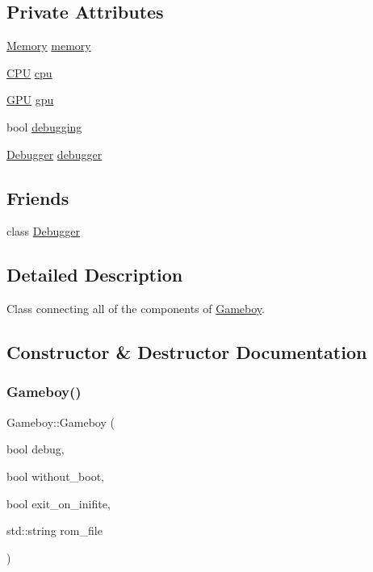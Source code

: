 \subsection*{Private Attributes}
\begin{DoxyCompactItemize}
\item 
\mbox{\hyperlink{classMemory}{Memory}} \mbox{\hyperlink{classGameboy_adf627b4691eb953f162584daf2b539a9}{memory}}
\item 
\mbox{\hyperlink{classCPU}{C\+PU}} \mbox{\hyperlink{classGameboy_a8efc19636204afd797a1fc3493bd2bce}{cpu}}
\item 
\mbox{\hyperlink{classGPU}{G\+PU}} \mbox{\hyperlink{classGameboy_ab5374ee382793a6e7f4fe26e55c9ff94}{gpu}}
\item 
bool \mbox{\hyperlink{classGameboy_a3806b14c93f07ab3aa7c8bce7f47ac5e}{debugging}}
\item 
\mbox{\hyperlink{classDebugger}{Debugger}} \mbox{\hyperlink{classGameboy_a284d695c0a40b955c520dab2e8ffd2be}{debugger}}
\end{DoxyCompactItemize}
\subsection*{Friends}
\begin{DoxyCompactItemize}
\item 
class \mbox{\hyperlink{classGameboy_af637948d2b98b924152a6f3bf5acdb6e}{Debugger}}
\end{DoxyCompactItemize}


\subsection{Detailed Description}
Class connecting all of the components of \mbox{\hyperlink{classGameboy}{Gameboy}}. 

\subsection{Constructor \& Destructor Documentation}
\mbox{\label{classGameboy_a2d4e84cda18ef3429a3dff15c7610265}} 
\subsubsection{\texorpdfstring{Gameboy()}{Gameboy()}}
{\footnotesize\ttfamily Gameboy\+::\+Gameboy (\begin{DoxyParamCaption}\item[{bool}]{debug,  }\item[{bool}]{without\+\_\+boot,  }\item[{bool}]{exit\+\_\+on\+\_\+inifite,  }\item[{std\+::string}]{rom\+\_\+file }\end{DoxyParamCaption})}



